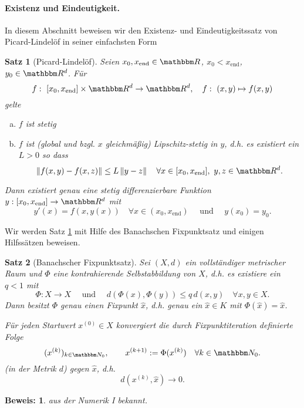 \documentclass[12pt,a4paper]{book}
\theoremstyle{break}
\newtheorem{theorem}{Satz}[chapter]
\theoremstyle{nonumberplain}
\newtheorem{beweis}{Beweis:}
\newcommand{\N}{\mathbbm N}
\newcommand{\R}{\mathbbm R}
\newcommand{\norm}[1]{\left\Vert#1\right\Vert}		%
\newcommand{\1}{\mathbbm{1}} 			      	%
\begin{document}
\paragraph{Existenz und Eindeutigkeit.} 
In diesem Abschnitt beweisen wir den Exis\-tenz- und Eindeutigkeitssatz von Picard-Lindel\"of in seiner einfachsten Form
\begin{theorem}[Picard-Lindel\"of]\label{thm:PL}
Seien $x_0,x_\mathrm{end}\in \R$, $x_0<x_\mathrm{end}$, $y_0\in \R^d$. Für 
\[
f:\ [x_0,x_\mathrm{end}]\times \R^{d}\to \R^d,  \quad f:\ (x,y)\mapsto f(x,y)
\]
gelte
\begin{enumerate}[(a)]
\item $f$ ist stetig
\item $f$ ist (global und bzgl. $x$ gleichmäßig) Lipschitz-stetig in $y$, d.h.
es existiert ein $L>0$ so dass
\[
\norm{f(x,y)-f(x,z)}\leq L \norm{y-z} \quad \forall x\in [x_0,x_\mathrm{end}],\ y,z\in \R^d.
\]
\end{enumerate}

Dann existiert genau eine stetig differenzierbare Funktion
$y: [x_0,x_\mathrm{end}]\to \R^d$ mit 
\[
y'(x)=f(x,y(x)) \quad \forall x\in (x_0,x_\mathrm{end}) \quad \mbox{ und } \quad y(x_0)=y_0.
\]
\end{theorem}

Wir werden Satz \ref{thm:PL} mit Hilfe des Banachschen Fixpunktsatz und einigen Hilfssätzen beweisen. 
\begin{theorem}[Banachscher Fixpunktsatz]
Sei $(X,d)$ ein vollständiger metrischer Raum und $\Phi$ eine 
\emph{kontrahierende Selbstabbildung} von $X$, d.h. es existiere ein $q<1$ mit
\[
\Phi: X\to X  \quad \mbox{ und } \quad d(\Phi(x), \Phi(y))\leq q\,  d(x,y)  \quad \forall x,y\in X.
\]
Dann besitzt $\Phi$ genau einen \emph{Fixpunkt} $\hat x$, d.h. genau ein $\hat x\in K$ mit $\Phi(\hat x)=\hat x$.

Für jeden Startwert $x^{(0)}\in X$ konvergiert die durch \emph{Fixpunktiteration} definierte Folge 
\[
(x^{(k)})_{k\in \N_0}, \qquad x^{(k+1)}:=\Phi(x^{(k)}) \quad \forall k\in \N_0.
\]
(in der Metrik $d$) gegen $\hat x$, d.h.
\[
d(x^{(k)}, \hat x)\to 0.
\]
\end{theorem}
\begin{beweis}
aus der Numerik I bekannt.
\end{beweis}
\end{document}
